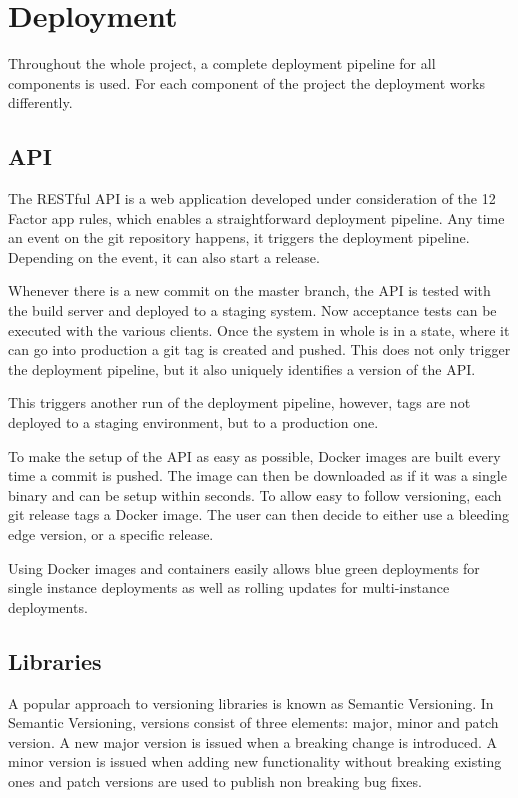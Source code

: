 \section{Deployment}

Throughout the whole project, a complete deployment pipeline for all components
is used. For each component of the project the deployment works differently.

\subsection{API}

The RESTful API is a web application developed under consideration of the 12 Factor
app rules, which enables a straightforward deployment pipeline. Any time an
event on the git repository happens, it triggers the deployment pipeline.
Depending on the event, it can also start a release.

Whenever there is a new commit on the master branch, the API is tested with the
build server and deployed to a staging system. Now acceptance tests can be
executed with the various clients. Once the system in whole is in a state,
where it can go into production a git tag is created and pushed. This does not
only trigger the deployment pipeline, but it also uniquely identifies a
version of the API.

This triggers another run of the deployment pipeline, however, tags are not
deployed to a staging environment, but to a production one.

To make the setup of the API as easy as possible, Docker images are built every
time a commit is pushed. The image can then be downloaded as if it was a single
binary and can be setup within seconds. To allow easy to follow versioning,
each git release tags a Docker image. The user can then decide to either use
a bleeding edge version, or a specific release.

Using Docker images and containers easily allows blue green deployments for
single instance deployments as well as rolling updates for multi-instance
deployments.

\subsection{Libraries}

A popular approach to versioning libraries is known as Semantic Versioning. In
Semantic Versioning, versions consist of three elements: major, minor and patch version.
A new major version is issued when a breaking change is introduced. A minor
version is issued when adding new functionality without breaking existing ones
and patch versions are used to publish non breaking bug fixes.

